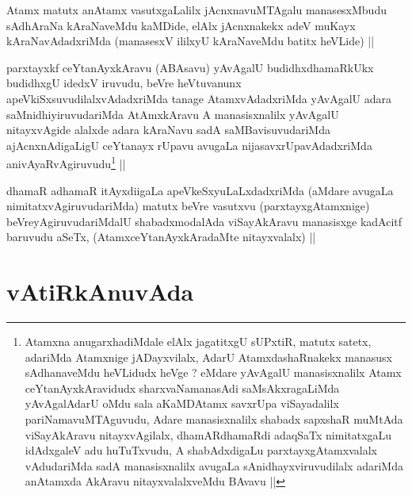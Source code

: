 \begin{artha}
Atamx matutx anAtamx vasutxgaLalilx jAcnxnavuMTAgalu manasesxMbudu
sAdhAraNa kAraNaveMdu kaMDide, elAlx jAcnxnakekx adeV muKayx
kAraNavAdadxriMda (manasesxV ililxyU kAraNaveMdu batitx heVLide) ||
\end{artha}


\begin{artha}
parxtayxkf ceYtanAyxkAravu (ABAsavu) yAvAgalU budidhxdhamaRkUkx
budidhxgU idedxV iruvudu, beVre heVtuvanunx
apeVkiSxsuvudilalxvAdadxriMda  tanage AtamxvAdadxriMda yAvAgalU adara
saMnidhiyiruvudariMda AtAmxkAravu A manasisxnalilx yAvAgalU
nitayxvAgide alalxde adara kAraNavu sadA saMBavisuvudariMda
ajAcnxnAdigaLigU ceYtanayx rUpavu avugaLa nijasavxrUpavAdadxriMda
anivAyaRvAgiruvudu\footnote{Atamxna anugarxhadiMdale elAlx jagatitxgU
  sUPxtiR, matutx satetx, adariMda Atamxnige jADayxvilalx, AdarU
  AtamxdashaRnakekx manasusx sAdhanaveMdu heVLidudx heVge ? eMdare
  yAvAgalU manasisxnalilx Atamx ceYtanAyxkAravidudx sharxvaNamanasAdi
  saMsAkxragaLiMda yAvAgalAdarU oMdu sala aKaMDAtamx savxrUpa
  viSayadalilx pariNamavuMTAguvudu, Adare manasisxnalilx shabadx
  sapxshaR muMtAda viSayAkAravu nitayxvAgilalx, dhamARdhamaRdi
  adaqSaTx nimitatxgaLu idAdxgaleV adu huTuTxvudu, A shabAdxdigaLu
  parxtayxgAtamxvalalx vAdudariMda sadA manasisxnalilx avugaLa
  sAnidhayxviruvudilalx adariMda anAtamxda AkAravu nitayxvalalxveMdu
  BAvavu ||} ||
\end{artha}


\begin{artha}
dhamaR adhamaR itAyxdiigaLa apeVkeSxyuLaLxdadxriMda (aMdare avugaLa
nimitatxvAgiruvudariMda) matutx beVre vasutxvu (parxtayxgAtamxnige)
beVreyAgiruvudariMdalU shabadxmodalAda viSayAkAravu manasisxge
kadAcitf baruvudu aSeTx, (AtamxceYtanAyxkAradaMte nitayxvalalx) ||
\end{artha}

\section*{vAtiRkAnuvAda}

